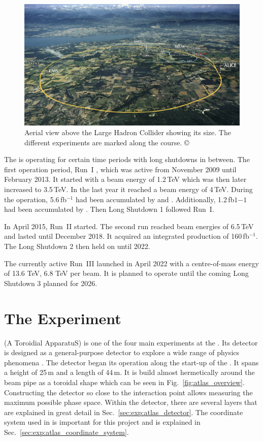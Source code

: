 \documentclass[bachelor,ngerman,english]{GAUBM}
\begin{document}
\begin{figure}[t]
    \centering
    \includegraphics[width=.80\textwidth]{figures/lhc/lhc_overview.jpg}
    \caption{Aerial view above the Large Hadron Collider showing its size. The different experiments are marked along the \lhc course. \copyright{\cern}}
    \label{fig:lhc_aerial_view}
\end{figure}

The \lhc is operating for certain time periods with long shutdowns in between. The first operation period, Run~I \cite{lhc_run1}, which was active from November 2009 until February 2013. It started with a beam energy of 1.2\,TeV which was then later increased to 3.5\,TeV. In the last year it reached a beam energy of 4\,TeV. During the operation, 5.6\,fb$^{-1}$ had been accumulated by \atlas and \cms. Additionally, 1.2\,fb$1{-1}$ had been accumulated by \lhcb. Then Long Shutdown 1 followed Run~I. 

In April 2015, Run~II \cite{lhc_run2} started. The second run reached beam energies of 6.5\,TeV and lasted until December 2018. It acquired an integrated production of 160\,fb$^{-1}$. The Long Shutdown 2 then held on until 2022. 

The currently active Run~III \cite{lhc_run3} launched in April 2022 with a centre-of-mass energy of 13.6 TeV, 6.8 TeV per beam. It is planned to operate until the coming Long Shutdown 3 planned for 2026. 


\section{The \atlas Experiment}
\label{sec:exp:atlas}
\atlas (A Toroidial \lhc ApparatuS) \cite{atlas} is one of the four main experiments at the \lhc. Its detector is designed as a general-purpose detector to explore a wide range of physics phenomena \cite{atlas:tech_design_report_01,atlas:tech_design_report_02}. The detector began its operation along the start-up of the \lhc. It spans a height of 25\,m and a length of 44\,m. It is build almost hermetically around the \lhc beam pipe as a toroidal shape which can be seen in Fig.~\ref{fig:atlas_overview}. Constructing the detector so close to the interaction point allows measuring the maximum possible phase space. Within the detector, there are several layers that are explained in great detail in Sec.~\ref{sec:exp:atlas_detector}. The coordinate system used in \atlas is important for this project and is explained in Sec.~\ref{sec:exp:atlas_coordinate_system}.
\end{document}
